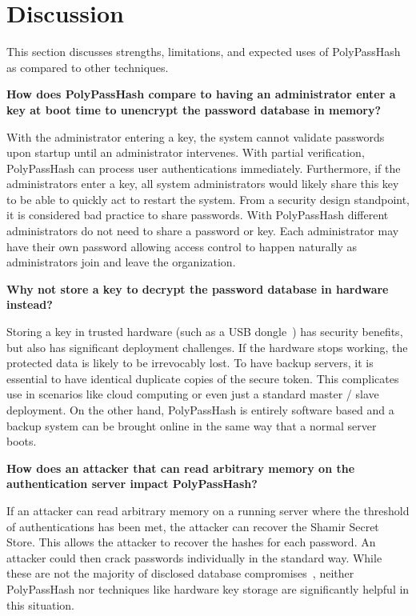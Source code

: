 \section{Discussion}
\label{sec-expecteduse}

This section discusses strengths, limitations, and expected uses of 
PolyPassHash as compared to other techniques.


{\bf How does PolyPassHash compare to having an administrator enter a key
at boot time to unencrypt the password database in memory?}

With the administrator entering a key, the system cannot validate passwords 
upon startup until an administrator intervenes.  With partial verification, 
PolyPassHash can process user authentications immediately.   Furthermore, 
if the administrators enter a key, all system administrators would likely 
share this key to be able to quickly act to restart the system.   From 
a security design standpoint, it is considered bad practice to share
passwords.  With 
PolyPassHash different administrators do not need to share a password or key.
Each administrator may have their own password allowing access control to 
happen naturally as administrators join and leave the organization.


{\bf Why not store a key to decrypt the password database in hardware instead?}

Storing a key in trusted hardware (such as a USB 
dongle~\cite{passwordhardwaredongle}) has security benefits,
but also has significant deployment challenges.  
If the hardware stops working, the protected data is 
likely to be irrevocably lost.  %
To have backup servers, it is essential to have identical 
duplicate copies of the secure token.   This complicates use in scenarios 
like cloud computing or even just a standard master / slave deployment.
On the other hand, PolyPassHash is entirely software based and a backup system
can be brought online in the same way that a normal server boots.



{\bf How does an attacker that can read arbitrary memory on the 
authentication server impact PolyPassHash?}

If an attacker can read arbitrary memory on a running server where the 
threshold of authentications has been met, the attacker can recover
the Shamir Secret Store.   This allows the attacker to recover the 
hashes for each password.   An attacker could then crack passwords
individually in the standard way.    While these are not the majority of
disclosed database compromises~\cite{passwordresearchblog,miranteTR13}, 
neither PolyPassHash nor techniques like hardware key storage 
are significantly helpful in this situation.

